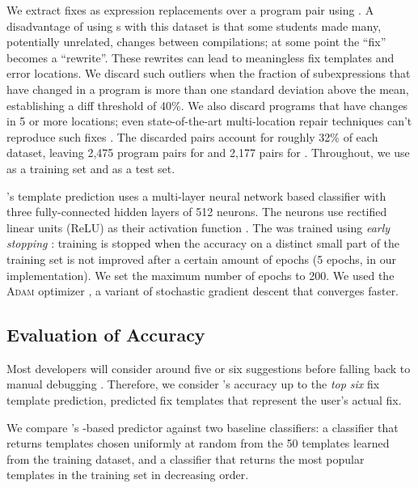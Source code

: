 %
We extract fixes as expression replacements over a program pair using \diffsym.
A disadvantage of using \diffsym s with this dataset is that some students
made many, potentially unrelated, changes between compilations; at some point
the ``fix'' becomes a ``rewrite''. These rewrites can lead to
meaningless fix templates and error locations. We discard such outliers when the
fraction of subexpressions that have changed in a program is more than one
standard deviation above the mean, establishing a diff threshold of 40\%. We
also discard programs that have changes in 5 or more locations; even
state-of-the-art multi-location repair techniques can't reproduce such fixes
\citep{Saha_2019}. The discarded pairs account for roughly 32\% of each
dataset, leaving 2,475 program pairs for \SPRING and 2,177 pairs for \FALL.
Throughout, we use \SPRING as a training set and \FALL as a test set.

%
\toolname's template prediction
uses a multi-layer neural network \dnn based
classifier with three fully-connected
hidden layers of 512 neurons. The neurons use
rectified linear units (ReLU) as their activation
function \citep{Nair2010-xg}.
%
The \dnn was trained using \emph{early stopping}
\cite{Hastie2009-bn}:
training is stopped when the accuracy on a distinct
small part of the training set is not improved after
a certain amount of epochs (5 epochs, in our implementation).
%
We set the maximum number of epochs to 200.
%
We used the \textsc{Adam} optimizer \citep{Kingma2014-ng},
a variant of stochastic gradient descent that converges faster.

\subsection{Evaluation of Accuracy}

\label{sec:eval:accuracy}

Most developers will consider around five or six suggestions before
falling back to manual debugging \citep{Kochhar2016-oc}.
%
Therefore, we consider \toolname's accuracy up to the \emph{top six}
fix template prediction, \ie predicted fix templates that represent
the user's actual fix.

%
We compare \toolname's \dnn-based predictor against two baseline
classifiers: a \random classifier that returns
templates
chosen uniformly at random from the 50 templates
learned from the \SPRING training dataset, and
a \popular classifier that returns the most
popular templates in the training set in
decreasing order.

